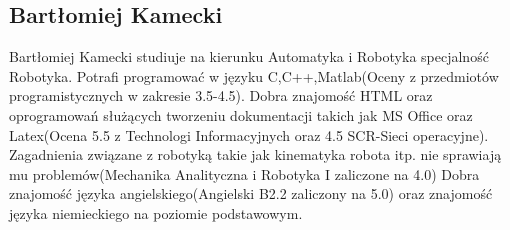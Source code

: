 \subsection{Bartłomiej Kamecki}
Bartłomiej Kamecki studiuje na kierunku Automatyka i Robotyka specjalność Robotyka. Potrafi programować w języku C,C++,Matlab(Oceny z przedmiotów programistycznych w zakresie 3.5-4.5). Dobra znajomość HTML oraz oprogramowań służących tworzeniu dokumentacji takich jak MS Office oraz Latex(Ocena 5.5 z Technologi Informacyjnych oraz 4.5 SCR-Sieci operacyjne). Zagadnienia związane z robotyką takie jak kinematyka robota itp. nie sprawiają mu problemów(Mechanika Analityczna i Robotyka I zaliczone na 4.0) Dobra znajomość języka angielskiego(Angielski B2.2 zaliczony na 5.0) oraz znajomość języka niemieckiego na poziomie podstawowym. 

